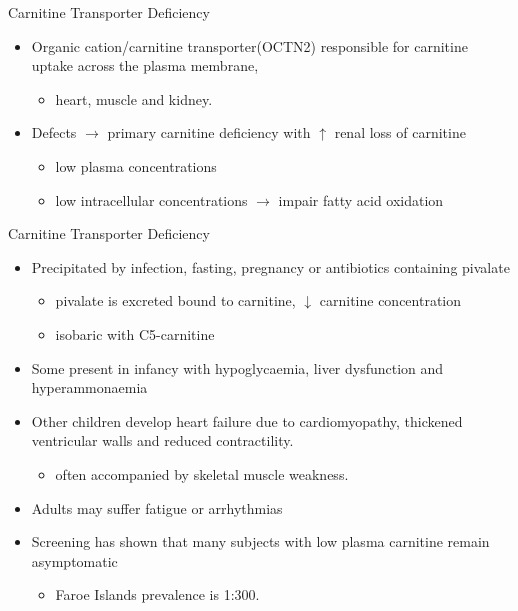 \documentclass[presentation, smaller]{beamer}
\begin{document}
\begin{frame}[label={sec:orgheadline4}]{Carnitine Transporter Deficiency}
\begin{itemize}
\item Organic cation/carnitine transporter(OCTN2) responsible for
carnitine uptake across the plasma membrane,
\begin{itemize}
\item heart, muscle and kidney.
\end{itemize}
\item Defects \(\to\) primary carnitine deficiency with \(\uparrow\) renal loss of carnitine
\begin{itemize}
\item low plasma concentrations
\item low intracellular concentrations \(\to\) impair fatty acid oxidation
\end{itemize}
\end{itemize}
\end{frame}
\begin{frame}[label={sec:orgheadline5}]{Carnitine Transporter Deficiency}
\begin{itemize}
\item Precipitated by infection, fasting, pregnancy or antibiotics containing pivalate
\begin{itemize}
\item pivalate is excreted bound to carnitine, \(\downarrow\) carnitine concentration
\item isobaric with C5-carnitine
\end{itemize}
\item Some present in infancy with hypoglycaemia, liver dysfunction and hyperammonaemia
\item Other children develop heart failure due to cardiomyopathy,
thickened ventricular walls and reduced contractility.
\begin{itemize}
\item often accompanied by skeletal muscle weakness.
\end{itemize}
\item Adults may suffer fatigue or arrhythmias
\item Screening has shown that many subjects with low plasma carnitine remain asymptomatic
\begin{itemize}
\item Faroe Islands prevalence is 1:300.
\end{itemize}
\end{itemize}
\end{frame}
\end{document}

